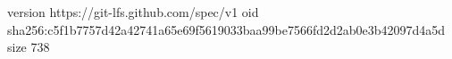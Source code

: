 version https://git-lfs.github.com/spec/v1
oid sha256:c5f1b7757d42a42741a65e69f5619033baa99be7566fd2d2ab0e3b42097d4a5d
size 738
